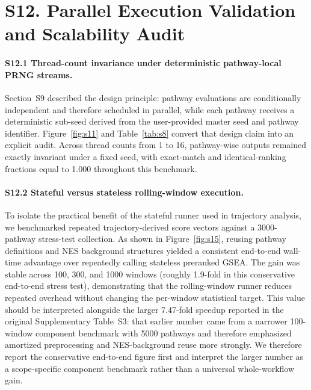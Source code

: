 \documentclass[11pt]{article}
\begin{document}
\section*{S12. Parallel Execution Validation and Scalability Audit}

\paragraph{S12.1 Thread-count invariance under deterministic pathway-local PRNG streams.}
Section~S9 described the design principle: pathway evaluations are conditionally independent and therefore scheduled in parallel, while each pathway receives a deterministic sub-seed derived from the user-provided master seed and pathway identifier. Figure~\ref{fig:s11} and Table~\ref{tab:s8} convert that design claim into an explicit audit. Across thread counts from 1 to 16, pathway-wise outputs remained exactly invariant under a fixed seed, with exact-match and identical-ranking fractions equal to 1.000 throughout this benchmark.

\begin{table}[htbp]
\centering
\caption{Parallel reproducibility audit across thread counts. Exact-match and identical-ranking fractions were computed relative to the 1-thread reference under the same input data and the same master seed.}
\label{tab:s8}
\scriptsize
\resizebox{\textwidth}{!}{}
\end{table}

\paragraph{S12.2 Stateful versus stateless rolling-window execution.}
To isolate the practical benefit of the stateful runner used in trajectory analysis, we benchmarked repeated trajectory-derived score vectors against a 3000-pathway stress-test collection. As shown in Figure~\ref{fig:s15}, reusing pathway definitions and NES background structures yielded a consistent end-to-end wall-time advantage over repeatedly calling stateless preranked GSEA. The gain was stable across 100, 300, and 1000 windows (roughly 1.9-fold in this conservative end-to-end stress test), demonstrating that the rolling-window runner reduces repeated overhead without changing the per-window statistical target. This value should be interpreted alongside the larger 7.47-fold speedup reported in the original Supplementary Table~S3: that earlier number came from a narrower 100-window component benchmark with 5000 pathways and therefore emphasized amortized preprocessing and NES-background reuse more strongly. We therefore report the conservative end-to-end figure first and interpret the larger number as a scope-specific component benchmark rather than a universal whole-workflow gain.
\end{document}
